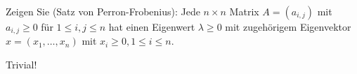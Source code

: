 \begin{exercise}

Zeigen Sie (Satz von Perron-Frobenius): Jede $n\times n$ Matrix $A = (a_{i,j})$ mit $a_{i,j} \geq 0$ für $1 \leq i, j \leq n$ hat einen Eigenwert $\lambda \geq 0$ mit zugehörigem Eigenvektor $x = (x_1,\dots,x_n)$ mit $x_i \geq 0, 1 \leq i \leq n$.

\end{exercise}

\begin{solution}

Trivial!

\end{solution}

